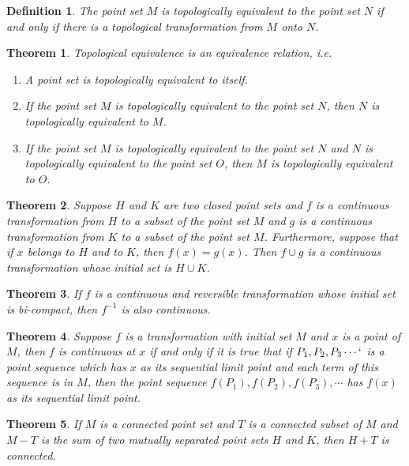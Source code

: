 \documentclass[10pt]{report}
\newtheorem{theorem}{Theorem}
\newtheorem{definition}{Definition}
\begin{document}
\begin{definition}
 The point set $M$ is topologically equivalent to the point set $N$ if and only
if there is a topological transformation from $M$ onto $N$.
\end{definition}

\begin{theorem}
 Topological equivalence is an equivalence relation, i.e.
 \begin{enumerate}
  \item A point set is topologically equivalent to itself.
  \item If the point set $M$ is topologically equivalent to the point set $N$,
then $N$ is topologically equivalent to $M$.
  \item If the point set $M$ is topologically equivalent to the point set $N$
and $N$ is topologically equivalent to the point set $O$, then $M$ is
topologically equivalent to $O$.
 \end{enumerate}
\end{theorem}

\begin{theorem}
 Suppose $H$ and $K$ are two closed point sets and $f$ is a continuous
transformation from $H$ to a subset of the point set $M$ and $g$ is a
continuous transformation from $K$ to a subset of the point set $M$.
Furthermore, suppose that if $x$ belongs to $H$ and to $K$, then $f(x)=g(x)$.
Then $f\cup g$ is a continuous transformation whose initial set is $H\cup K$.
\end{theorem}

\begin{theorem}
 If $f$ is a continuous and reversible transformation whose initial set is
bi-compact, then $f^{-1}$ is also continuous.
\end{theorem}

\begin{theorem}
 Suppose $f$ is a transformation with initial set $M$ and $x$ is a point of $M$,
then $f$ is continuous at $x$ if and only if it is true that if
$P_1,P_2,P_3\cdots`$ is a point sequence which has $x$ as its sequential limit
point and each term of this sequence is in $M$, then the point sequence
$f(P_1),f(P_2),f(P_3),\cdots$ has $f(x)$ as its sequential limit point.
\end{theorem}

\begin{theorem}
 If $M$ is a connected point set and $T$ is a connected subset of $M$ and $M-T$ is the sum of two mutually separated
point sets $H$ and $K$, then $H+T$ is connected.
\end{theorem}
\end{document}
